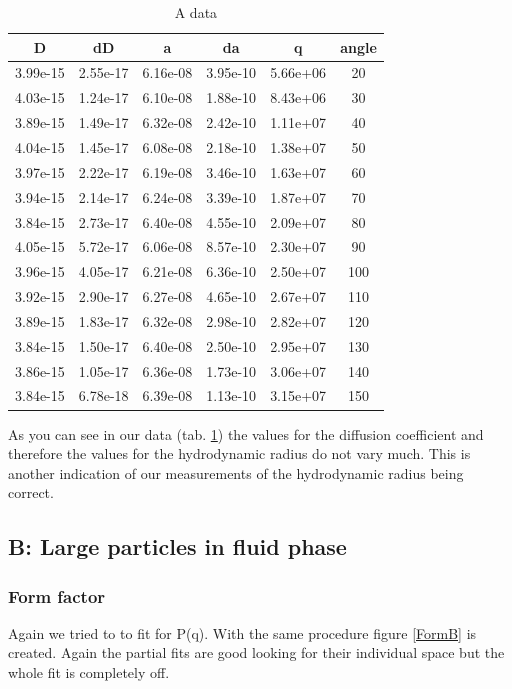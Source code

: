 \documentclass[]{article}
\begin{document}
\begin{table}[!htbp]
	\centering
	\begin{tabular}{|c|c|c|c|c|c|}
		\hline
		D & dD & a & da & q & angle \\ \hline\hline
		3.99e-15 & 2.55e-17 & 6.16e-08 & 3.95e-10 & 5.66e+06 & 20 \\ \hline
		4.03e-15 & 1.24e-17 & 6.10e-08 & 1.88e-10 & 8.43e+06 & 30 \\ \hline
		3.89e-15 & 1.49e-17 & 6.32e-08 & 2.42e-10 & 1.11e+07 & 40 \\ \hline
		4.04e-15 & 1.45e-17 & 6.08e-08 & 2.18e-10 & 1.38e+07 & 50 \\ \hline
		3.97e-15 & 2.22e-17 & 6.19e-08 & 3.46e-10 & 1.63e+07 & 60 \\ \hline
		3.94e-15 & 2.14e-17 & 6.24e-08 & 3.39e-10 & 1.87e+07 & 70 \\ \hline
		3.84e-15 & 2.73e-17 & 6.40e-08 & 4.55e-10 & 2.09e+07 & 80 \\ \hline
		4.05e-15 & 5.72e-17 & 6.06e-08 & 8.57e-10 & 2.30e+07 & 90 \\ \hline
		3.96e-15 & 4.05e-17 & 6.21e-08 & 6.36e-10 & 2.50e+07 & 100 \\ \hline
		3.92e-15 & 2.90e-17 & 6.27e-08 & 4.65e-10 & 2.67e+07 & 110 \\ \hline
		3.89e-15 & 1.83e-17 & 6.32e-08 & 2.98e-10 & 2.82e+07 & 120 \\ \hline
		3.84e-15 & 1.50e-17 & 6.40e-08 & 2.50e-10 & 2.95e+07 & 130 \\ \hline
		3.86e-15 & 1.05e-17 & 6.36e-08 & 1.73e-10 & 3.06e+07 & 140 \\ \hline
		3.84e-15 & 6.78e-18 & 6.39e-08 & 1.13e-10 & 3.15e+07 & 150 \\ \hline
		\hline
	\end{tabular}
	\caption{A data}
	\label{tab:adata}
\end{table}
As you can see in our data (tab. \ref{tab:adata}) the values for the diffusion coefficient and therefore the values for the hydrodynamic radius do not vary much. This is another indication of our measurements of the hydrodynamic radius being correct. 

\subsection{B: Large particles in fluid phase}
\subsubsection{Form factor}
Again we tried to to fit for P(q). With the same procedure figure \ref{FormB} is created. Again the partial fits are good looking for their individual space but the whole fit is completely off.
\end{document}
